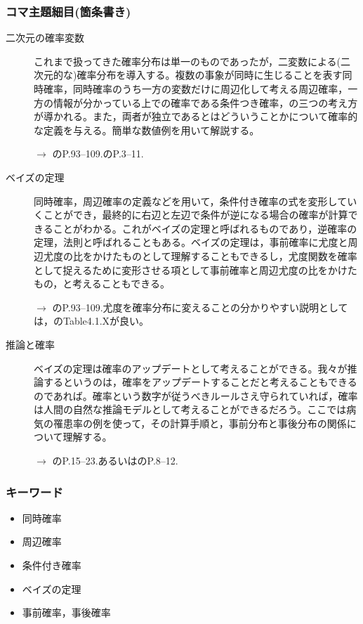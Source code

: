 \subsubsection{コマ主題細目(箇条書き)}
\begin{description}
\item[二次元の確率変数]これまで扱ってきた確率分布は単一のものであったが，二変数による(二次元的な)確率分布を導入する。複数の事象が同時に生じることを表す同時確率，同時確率のうち一方の変数だけに周辺化して考える周辺確率，一方の情報が分かっている上での確率である条件つき確率，の三つの考え方が導かれる。また，両者が独立であるとはどういうことかについて確率的な定義を与える。簡単な数値例を用いて解説する。
\begin{flushright}
    $\to$ \citet{Maeda2017}のP.93--109.\citet{豊田201506}のP.3--11.
\end{flushright}

\item[ベイズの定理]同時確率，周辺確率の定義などを用いて，条件付き確率の式を変形していくことができ，最終的に右辺と左辺で条件が逆になる場合の確率が計算できることがわかる。これがベイズの定理と呼ばれるものであり，逆確率の定理，法則と呼ばれることもある。ベイズの定理は，事前確率に尤度と周辺尤度の比をかけたものとして理解することもできるし，尤度関数を確率として捉えるために変形させる項として事前確率と周辺尤度の比をかけたもの，と考えることもできる。
\begin{flushright}
    $\to$ \citet{Maeda2017}のP.93--109.尤度を確率分布に変えることの分かりやすい説明としては，\citet{Lambert201805}のTable4.1.Xが良い。
\end{flushright}

\item[推論と確率]ベイズの定理は確率のアップデートとして考えることができる。我々が推論するというのは，確率をアップデートすることだと考えることもできるのであれば。確率という数字が従うべきルールさえ守られていれば，確率は人間の自然な推論モデルとして考えることができるだろう。ここでは病気の罹患率の例を使って，その計算手順と，事前分布と事後分布の関係について理解する。
\begin{flushright}
    $\to$ \citet{Maeda2017}のP.15--23.あるいは\citet{豊田201506}のP.8--12.
\end{flushright}

\end{description}
\subsubsection{キーワード}
\begin{itemize}
\item 同時確率
\item 周辺確率
\item 条件付き確率
\item ベイズの定理
\item 事前確率，事後確率
\end{itemize}
